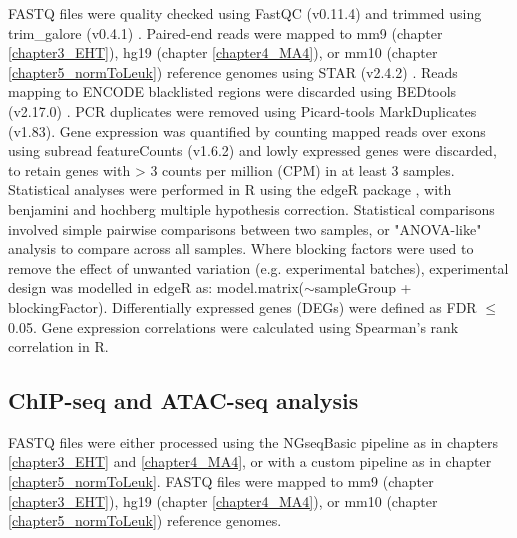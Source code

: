 FASTQ files were quality checked using FastQC (v0.11.4) and trimmed using trim\_galore (v0.4.1) \citep{martin_cutadapt_2011}. Paired-end reads were mapped to mm9 (chapter \ref{chapter3_EHT}), hg19 (chapter \ref{chapter4_MA4}), or mm10 (chapter \ref{chapter5_normToLeuk}) reference genomes using STAR (v2.4.2) \citep{dobin_star_2013}. Reads mapping to ENCODE blacklisted regions \citep{amemiya_encode_2019} were discarded using BEDtools (v2.17.0) \citep{quinlan_bedtools_2010}. PCR duplicates were removed using Picard-tools MarkDuplicates (v1.83). Gene expression was quantified by counting mapped reads over exons using subread featureCounts (v1.6.2) \citep{liao_featurecounts_2014} and lowly expressed genes were discarded, to retain genes with > 3 counts per million (CPM) in at least 3 samples. Statistical analyses were performed in R \citep{r_core_team_r_2021} using the edgeR package \citep{robinson_edger:_2010}, with benjamini and hochberg multiple hypothesis correction. Statistical comparisons involved simple pairwise comparisons between two samples, or "ANOVA-like" analysis \citep{robinson_edger:_2010} to compare across all samples. Where blocking factors were used to remove the effect of unwanted variation (e.g. experimental batches), experimental design was modelled in edgeR as: model.matrix($\sim$sampleGroup + blockingFactor). Differentially expressed genes (DEGs) were defined as FDR $\leq$ 0.05. Gene expression correlations were calculated using Spearman's rank correlation in R.

\subsection{\label{ch2:chip-atac-analysis}ChIP-seq and ATAC-seq analysis}

FASTQ files were either processed using the NGseqBasic pipeline \citep{telenius_ngseqbasic_2018} as in chapters \ref{chapter3_EHT} and \ref{chapter4_MA4}, or with a custom pipeline as in chapter \ref{chapter5_normToLeuk}. FASTQ files were mapped to mm9 (chapter \ref{chapter3_EHT}), hg19 (chapter \ref{chapter4_MA4}), or mm10 (chapter \ref{chapter5_normToLeuk}) reference genomes. 

